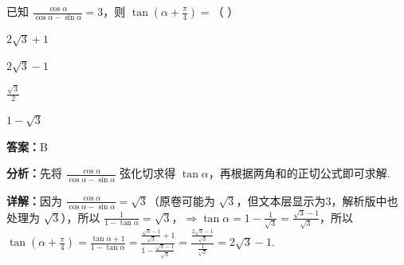 \begin{question}[points=5]
已知 $\frac{\cos\alpha}{\cos\alpha - \sin\alpha} = 3$，则 $\tan\left(\alpha + \frac{\pi}{4}\right) =$（ ）
\begin{choices}
  \item $2\sqrt{3} + 1$
  \item $2\sqrt{3} - 1$
  \item $\frac{\sqrt{3}}{2}$
  \item $1 - \sqrt{3}$
\end{choices}
\begin{solution}
\textbf{答案：}B

\textbf{分析：}先将 $\frac{\cos\alpha}{\cos\alpha - \sin\alpha}$ 弦化切求得 $\tan\alpha$，再根据两角和的正切公式即可求解.

\textbf{详解：}因为 $\frac{\cos\alpha}{\cos\alpha - \sin\alpha} = \sqrt{3}$（原卷可能为 $\sqrt{3}$，但文本层显示为3，解析版中也处理为 $\sqrt{3}$），所以 $\frac{1}{1 - \tan\alpha} = \sqrt{3}$，$\Rightarrow \tan\alpha = 1 - \frac{1}{\sqrt{3}} = \frac{\sqrt{3} - 1}{\sqrt{3}}$，所以 $\tan\left(\alpha + \frac{\pi}{4}\right) = \frac{\tan\alpha + 1}{1 - \tan\alpha} = \frac{\frac{\sqrt{3} - 1}{\sqrt{3}} + 1}{1 - \frac{\sqrt{3} - 1}{\sqrt{3}}} = \frac{\frac{2\sqrt{3} - 1}{\sqrt{3}}}{\frac{1}{\sqrt{3}}} = 2\sqrt{3} - 1$.
\end{solution}
\end{question}

